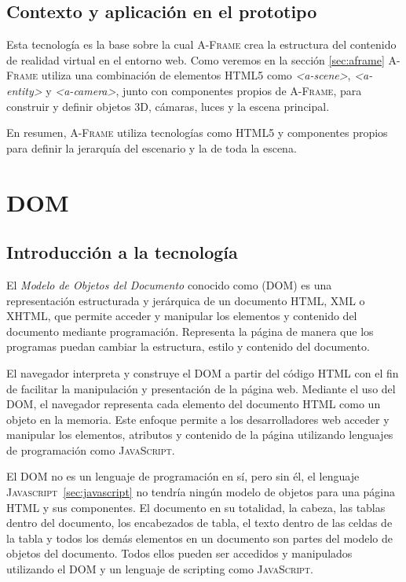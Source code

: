 \documentclass[a4paper, 11pt]{book}
\begin{document}
\subsection{Contexto y aplicación en el prototipo}
Esta tecnología es la base sobre la cual \textsc{A-Frame} crea la estructura del contenido de realidad virtual en el entorno web. 
Como veremos en la sección \ref{sec:aframe} \textsc{A-Frame} utiliza una combinación de elementos \textsc{HTML5} como \emph{\textless a-scene\textgreater}, \emph{\textless a-entity\textgreater} y \emph{\textless a-camera\textgreater}, junto con componentes propios de \textsc{A-Frame}, para construir y definir objetos \textsc{\gls{3D}}, cámaras, luces y la escena principal.

En resumen, \textsc{A-Frame} utiliza tecnologías como \textsc{HTML5} y componentes propios para definir la jerarquía del escenario y la  de toda la escena.
\section{DOM}
\label{sec:dom}
\subsection{Introducción a la tecnología}
El \emph{Modelo de Objetos del Documento} conocido como (\textsc{DOM}) es una representación estructurada y jerárquica de un documento \textsc{HTML}, \textsc{XML} o \textsc{XHTML}, que permite acceder y manipular los elementos y contenido del documento mediante programación. Representa la página de manera que los programas puedan cambiar la estructura, estilo y contenido del documento.

El navegador interpreta y construye el \textsc{DOM} a partir del código \textsc{HTML} con el fin de facilitar la manipulación y presentación de la página web. Mediante el uso del \textsc{DOM}, el navegador representa cada elemento del documento \textsc{HTML} como un objeto en la memoria. Este enfoque permite a los desarrolladores web acceder y manipular los elementos, atributos y contenido de la página utilizando lenguajes de programación como \textsc{JavaScript}.

El DOM no es un lenguaje de programación en sí, pero sin él, el lenguaje \textsc{Javascript}~\ref{sec:javascript} no tendría ningún modelo de objetos para una página HTML y sus componentes. El documento en su totalidad, la cabeza, las tablas dentro del documento, los encabezados de tabla, el texto dentro de las celdas de la tabla y todos los demás elementos en un documento son partes del modelo de objetos del documento. Todos ellos pueden ser accedidos y manipulados utilizando el DOM y un lenguaje de scripting como \textsc{JavaScript}.
\end{document}
